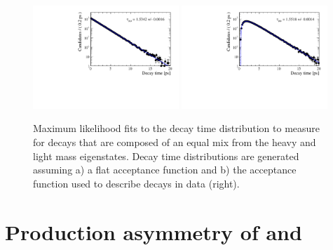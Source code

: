 \begin{figure}[tb]
  \centering
    \includegraphics[width=0.49\textwidth]{./Figs/LifetimeSystematics/No_acc_fit.pdf}
    \includegraphics[width=0.49\textwidth]{./Figs/LifetimeSystematics/Acc_fit.pdf}
  \caption{Maximum likelihood fits to the decay time distribution to measure \tmumu for \bsmumu decays that are composed of an equal mix from the heavy and light mass eigenstates. Decay time distributions are generated assuming a) a flat acceptance function and b) the acceptance function used to describe \bsmumu decays in data (right).}
  \label{fig:mixofstates}
\end{figure}

\section[Production asymmetry of \bs and $\overline{B}_{s}^{0}$]{Production asymmetry of \boldmath{\bs} and }
\label{sec:productionasymetry}



